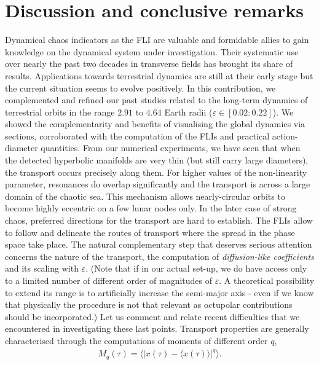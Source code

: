 \documentclass{amsart}
\theoremstyle{definition}
\theoremstyle{remark}
\numberwithin{equation}{section}
\begin{document}
\section{Discussion and conclusive remarks}\label{sec:discussion}
Dynamical chaos indicators as the FLI are valuable and formidable allies to gain knowledge on the dynamical system under investigation.  Their systematic use over nearly the past two decades in transverse fields has brought its share of results. Applications towards terrestrial dynamics are still at their early stage but the current situation seems to evolve positively.  
In this contribution, we complemented and refined our past studies related to the long-term dynamics of terrestrial orbits in the range $2.91$ to $4.64$ Earth radii ($\varepsilon \in [0.02:0.22]$). We showed the complementarity and benefits of visualising the global dynamics via sections, corroborated with the  computation of the FLIs and practical action-diameter quantities. From our numerical experiments, we have seen that when the detected hyperbolic manifolds are very thin (but still carry large diameters), the transport occurs precisely along them. For higher values of the non-linearity parameter, resonances do overlap significantly  and the transport is across a large domain of the chaotic sea. This mechanism allows nearly-circular orbits to become highly eccentric on a few lunar nodes only.  In the later case of strong chaos, preferred directions for the transport are hard to establish. The FLIs allow to follow and delineate the routes of transport where the spread in the phase space take place.
The natural  complementary step that deserves serious attention concerns  the nature of the transport, the computation of \textit{diffusion-{\color{black}like} coefficients} and its scaling with $\varepsilon$. (Note that if in our actual set-up, we do have access only to a limited number of different order of magnitudes of $\varepsilon$. A theoretical possibility to extend its range is to artificially increase the semi-major axis - even if we know that physically the procedure is not that relevant as octupolar contributions should be incorporated.) Let us comment and relate recent difficulties that we encountered in investigating these last points. 
Transport properties are generally characterised through the computations of moments of different order $q$,
\begin{align}
	M_{q}(\tau) = \big\langle \vert x(\tau) - \langle x(\tau) \rangle \vert^{q} \big\rangle.
\end{align}
\end{document}
